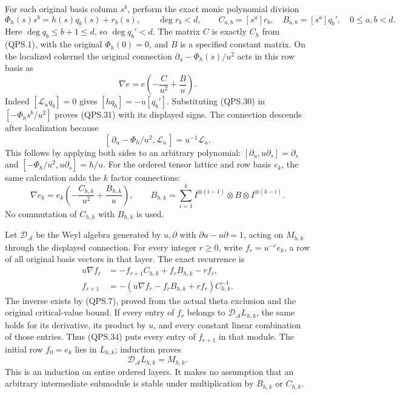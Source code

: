 For each original basis column \(s^b\), perform the exact monic
polynomial division
\[
 \Phi_h(s)s^b=h(s)q_b(s)+r_b(s),\qquad
 \deg r_b<d,\qquad
 C_{a,b}=[s^a]r_b,\quad B_{a,b}=[s^a]q_b',
                 \quad 0\leq a,b<d.
 \tag{QPS.30}
\]
Here \(\deg q_b\leq b+1\leq d\), so \(\deg q_b'<d\).
The matrix \(C\) is exactly \(C_h\) from (QPS.1), with the
original \(\Phi_h(0)=0\), and \(B\) is a specified constant
matrix. On the localized cokernel the original connection
\(\partial_u-\Phi_h(s)/u^2\) acts in this row basis as
\[
 \nabla e=e\left(-\frac{C}{u^2}+\frac{B}{u}\right).
 \tag{QPS.31}
\]
Indeed \([\mathcal L_u q_b]=0\) gives
\([h q_b]=-u[q_b']\). Substituting (QPS.30) in
\([-\Phi_hs^b/u^2]\) proves (QPS.31) with its displayed signs.
The connection descends after localization because
\[
 [\,\partial_u-\Phi_h/u^2,\mathcal L_u\,]
       =u^{-1}\mathcal L_u.
 \tag{QPS.32}
\]
This follows by applying both sides to an arbitrary polynomial:
\([\partial_u,u\partial_s]=\partial_s\) and
\([-\Phi_h/u^2,u\partial_s]=h/u\).
For the ordered tensor lattice and row basis \(e_k\), the same
calculation adds the \(k\) factor connections:
\[
 \nabla e_k=e_k\left(-\frac{C_{h,k}}{u^2}
                         +\frac{B_{h,k}}u\right),\qquad
 B_{h,k}=\sum_{i=1}^k
     I^{\otimes(i-1)}\otimes B\otimes I^{\otimes(k-i)}.
 \tag{QPS.33}
\]
No commutation of \(C_{h,k}\) with \(B_{h,k}\) is used.

Let \(\mathcal D_{\mathcal A}\) be the Weyl algebra generated by
\(u,\partial\) with \(\partial u-u\partial=1\), acting on
\(M_{h,k}\) through the displayed connection. For every integer
\(r\geq0\), write \(f_r=u^{-r}e_k\), a row of all original
basis vectors in that layer. The exact recurrence is
\[
 \begin{split}
 u\nabla f_r&=-f_{r+1}C_{h,k}+f_rB_{h,k}-r f_r,\\
 f_{r+1}&=-
   (u\nabla f_r-f_rB_{h,k}+r f_r)C_{h,k}^{-1}.
 \end{split}
 \tag{QPS.34}
\]
The inverse exists by (QPS.7), proved from the actual theta
exclusion and the original critical-value bound. If every entry
of \(f_r\) belongs to \(\mathcal D_{\mathcal A}L_{h,k}\), the
same holds for its derivative, its product by \(u\), and every
constant linear combination of those entries. Thus (QPS.34)
puts every entry of \(f_{r+1}\) in that module. The initial row
\(f_0=e_k\) lies in \(L_{h,k}\); induction proves
\[
 \mathcal D_{\mathcal A}L_{h,k}=M_{h,k}.
 \tag{QPS.35}
\]
This is an induction on entire ordered layers. It makes no
assumption that an arbitrary intermediate submodule is stable
under multiplication by \(B_{h,k}\) or \(C_{h,k}\).

